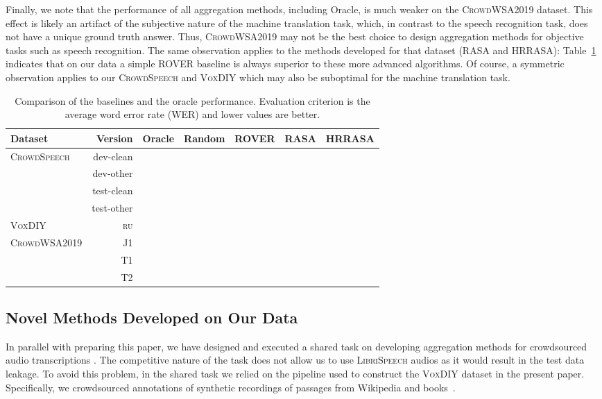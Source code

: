 \documentclass{article}
\newcommand{\libri}{\textsc{LibriSpeech}}
\newcommand{\speech}{\textsc{CrowdSpeech}}
\newcommand{\vox}{\textsc{VoxDIY}}
\newcommand{\crowd}{\textsc{CrowdWSA2019}}
\begin{document}
Finally, we note that the performance of all aggregation methods, including Oracle, is much weaker on the \crowd{} dataset. This effect is likely an artifact of the subjective nature of the machine translation task, which, in contrast to the speech recognition task, does not have a unique ground truth answer. Thus, 
\crowd{} may not be the best choice to design aggregation methods for objective tasks such as speech recognition. The same observation applies to the methods developed for that dataset (RASA and HRRASA): Table~\ref{tab:comparison} indicates that on our data a simple ROVER baseline is always superior to these more advanced algorithms. Of course, a symmetric observation applies to our \speech{} and \vox{} which may also be suboptimal for the machine translation task. 

\begin{table}[t]
\centering
\caption{\label{tab:comparison}Comparison of the baselines and the oracle performance. Evaluation criterion is the average word error rate (WER) and lower values are better.}
\begin{tabular}{lrrrrrr}\toprule
\textbf{Dataset} & \textbf{Version} & \textbf{Oracle} & \textbf{Random} &  \textbf{ROVER} & \textbf{RASA} & \textbf{HRRASA} \\\midrule
\multirow{4}{*}{\speech}
& dev-clean &  &  &   &  &  \\
& dev-other &  &  &  &  &  \\
& test-clean &  &  &   &  &  \\
& test-other &   &  & &  &  \\\midrule
{\vox} & \textsc{ru} &  &  &   &  &  \\\midrule
\multirow{3}{*}{\crowd} & J1 &  &  &   &  &  \\
& T1 &  &  &   &  & \\
& T2 &  &  &   &  &  \\\bottomrule
\end{tabular}
\end{table}


\subsection{Novel Methods Developed on Our Data}
\label{section:st}

In parallel with preparing this paper, we have designed and executed a shared task on developing aggregation methods for crowdsourced audio transcriptions \citep{VLDB2021Challenge}. The competitive nature of the task does not allow us to use \libri{} audios as it would result in the test data leakage. To avoid this problem, in the shared task we relied on the pipeline used to construct the \vox{} dataset in the present paper. Specifically, we crowdsourced annotations of synthetic recordings of passages from Wikipedia and books~\citep{soskkobayashi2018bookcorpus}.
\end{document}
